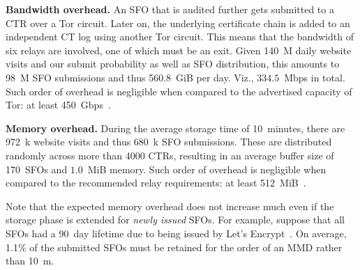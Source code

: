 \textbf{Bandwidth overhead.}  An SFO that is audited further gets submitted to
a CTR over a Tor circuit.  Later on, the underlying certificate chain is added
to an independent CT log using another Tor circuit.  This means that the
bandwidth of six relays are involved, one of which must be an exit.  Given 140~M
daily website visits and our submit probability as well as SFO distribution,
this amounts to 98~M SFO submissions and thus 560.8~GiB per day.  Viz.,
$334.5$~Mbps in total.  Such order of overhead is negligible when compared to
the advertised capacity of Tor:
	at least 450~Gbps~\cite{tor-bandwidth}.

\textbf{Memory overhead.}
During the average storage time of 10~minutes, there are 972~k website visits
and thus 680~k SFO submissions.  These are distributed randomly across more than
4000 CTRs, resulting in an average buffer size of 170~SFOs and $1.0$~MiB memory.
Such order of overhead is negligible when compared to the recommended relay
requirements:
	at least 512~MiB~\cite{relay-config}.

Note that the expected memory overhead does not increase much even if the
storage phase is extended for \emph{newly issued} SFOs.  For example, suppose
that all SFOs had a 90~day lifetime due to being issued by Let's
Encrypt~\cite{le}.  On average, 1.1\% of the submitted SFOs must be retained for
the order of an MMD rather than 10~m.
